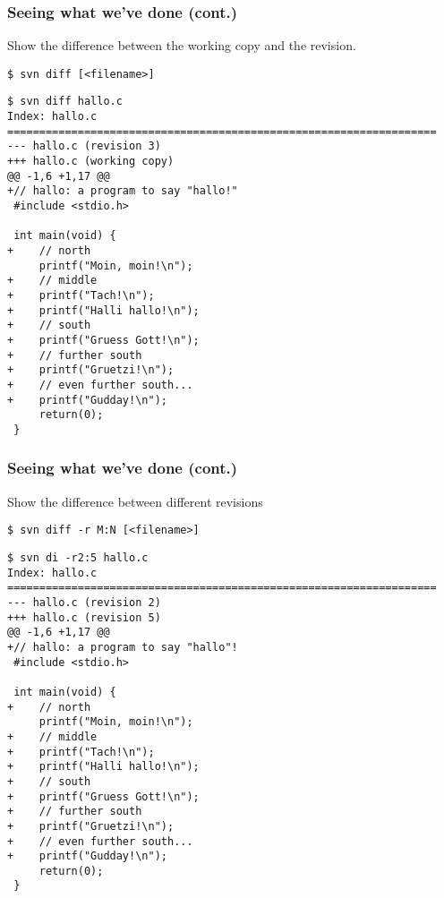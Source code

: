 \begin{frame}[fragile]
    \frametitle{Seeing what we've done (cont.)}
    \linuxframe
    \vspace*{-2mm}
    Show the difference between the working copy and the  revision.
\begin{lstlisting}
$ svn diff [<filename>]
\end{lstlisting}

\begin{lstlisting}[basicstyle=\tiny\ttfamily\color{black}]
$ svn diff hallo.c
Index: hallo.c
===================================================================
--- hallo.c (revision 3)
+++ hallo.c (working copy)
@@ -1,6 +1,17 @@
+// hallo: a program to say "hallo!"
 #include <stdio.h>
 
 int main(void) {
+    // north
     printf("Moin, moin!\n");
+    // middle
+    printf("Tach!\n");
+    printf("Halli hallo!\n");
+    // south
+    printf("Gruess Gott!\n");
+    // further south
+    printf("Gruetzi!\n");
+    // even further south...
+    printf("Gudday!\n");
     return(0);
 }
\end{lstlisting}
\end{frame}

\begin{frame}[fragile]
    \frametitle{Seeing what we've done (cont.)}
    \linuxframe
    \vspace*{-2mm}
    Show the difference between different revisions
\begin{lstlisting}
$ svn diff -r M:N [<filename>]
\end{lstlisting}

\begin{lstlisting}[basicstyle=\tiny\ttfamily\color{black}]
$ svn di -r2:5 hallo.c
Index: hallo.c
===================================================================
--- hallo.c (revision 2)
+++ hallo.c (revision 5)
@@ -1,6 +1,17 @@
+// hallo: a program to say "hallo"!
 #include <stdio.h>
 
 int main(void) {
+    // north
     printf("Moin, moin!\n");
+    // middle
+    printf("Tach!\n");
+    printf("Halli hallo!\n");
+    // south
+    printf("Gruess Gott!\n");
+    // further south
+    printf("Gruetzi!\n");
+    // even further south...
+    printf("Gudday!\n");
     return(0);
 }
\end{lstlisting}

\end{frame}

